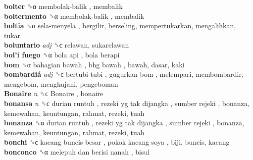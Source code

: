 \textbf{bolter} ␝α   membolak-balik , membalik  \\
\textbf{boltermento} ␝α   membolak-balik , membalik  \\
\textbf{boltia} ␝α   sela-menyela , bergilir, berseling, mempertukarkan, mengalihkan, tukar  \\
\textbf{boluntario} \emph{adj}  ␝ϲ  relawan, sukarelawan  \\
\textbf{bol’i fuego} ␝α   bola api ,  bola berapi   \\
\textbf{bom} ␝α   bahagian bawah ,  bhg bawah , bawah, dasar, kaki  \\
\textbf{bombardiá} \emph{adj}  ␝ϲ   bertubi-tubi ,  gugurkan bom , melempari, membombardir, mengebom, menghujani, pengeboman  \\
\textbf{Bonaire} \emph{n}  ␝ϲ   Bonaire , bonaire  \\
\textbf{bonansa} \emph{n}  ␝ϲ   durian runtuh ,  rezeki yg tak dijangka ,  sumber rejeki , bonanza, kemewahan, keuntungan, rahmat, rezeki, tuah  \\
\textbf{bonanza} ␝α   durian runtuh ,  rezeki yg tak dijangka ,  sumber rejeki , bonanza, kemewahan, keuntungan, rahmat, rezeki, tuah  \\
\textbf{bonchi} ␝ϲ   kacang buncis besar ,  pokok kacang soya , biji, buncis, kacang  \\
\textbf{bonconco} ␝α   melepuh dan berisi nanah , bisul  \\
